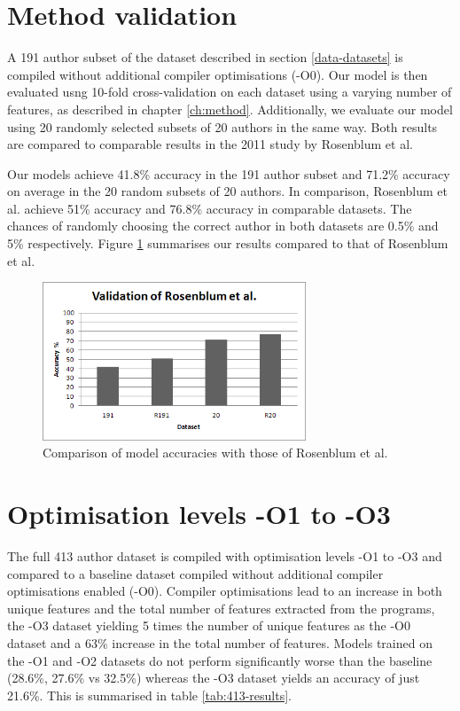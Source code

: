 \documentclass[a4paper,11pt]{kth-mag}
\begin{document}
\section{Method validation}
A 191 author subset of the dataset described in section \ref{data-datasets} is
compiled without additional compiler optimisations (-O0). Our model is then
evaluated usng 10-fold cross-validation on each dataset using a varying number
of features, as described in chapter \ref{ch:method}. Additionally, we evaluate
our model using 20 randomly selected subsets of 20 authors in the same way.
Both results are compared to comparable results in the 2011 study by Rosenblum
et al.

Our models achieve 41.8\% accuracy in the 191 author subset and 71.2\% accuracy
on average in the 20 random subsets of 20 authors. In comparison, Rosenblum et
al. achieve 51\% accuracy and 76.8\% accuracy in comparable datasets. The
chances of randomly choosing the correct author in both datasets are 0.5\% and
5\% respectively. Figure \ref{fig:rosenblumvalidation} summarises our results
compared to that of Rosenblum et al.

\begin{figure}[!htb]
    \centering
    \includegraphics[width=0.7\textwidth]{rosenblumvalidation}
    \caption{Comparison of model accuracies with those of Rosenblum et al.}
    \label{fig:rosenblumvalidation}
\end{figure}

\section{Optimisation levels -O1 to -O3}
The full 413 author dataset is compiled with optimisation levels -O1 to -O3 and
compared to a baseline dataset compiled without additional compiler
optimisations enabled (-O0). Compiler optimisations lead to an increase in both
unique features and the total number of features extracted from the programs,
the -O3 dataset yielding 5 times the number of unique features as the -O0
dataset and a 63\% increase in the total number of features. Models trained on
the -O1 and -O2 datasets do not perform significantly worse than the baseline
(28.6\%, 27.6\%  vs 32.5\%) whereas the -O3 dataset yields an accuracy of just 21.6\%.
This is summarised in table \ref{tab:413-results}.
\end{document}
